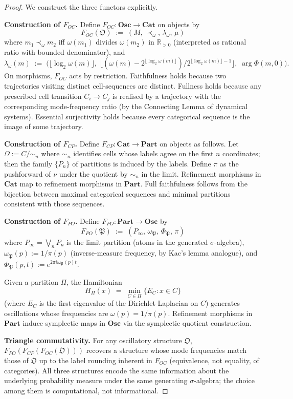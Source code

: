 \begin{proof}
We construct the three functors explicitly.

\smallskip
\noindent\textbf{Construction of $F_{OC}$.}
Define $F_{OC} : \mathbf{Osc} \to \mathbf{Cat}$ on objects by
\[
  F_{OC}(\mathfrak{O}) \;:=\; (M,\, \prec_\omega,\, \lambda_\omega,\, \mu)
\]
where $m_1 \prec_\omega m_2$ iff $\omega(m_1)$ divides $\omega(m_2)$ in
$\mathbb{R}_{>0}$ (interpreted as rational ratio with bounded denominator),
and
\[
  \lambda_\omega(m) \;:=\;
  \bigl(\lfloor \log_2 \omega(m) \rfloor,\;
   \lfloor (\omega(m) - 2^{\lfloor \log_2 \omega(m) \rfloor})
   / 2^{\lfloor \log_2 \omega(m) \rfloor - 1} \rfloor,\;
   \arg \Phi(m, 0) \bigr).
\]
On morphisms, $F_{OC}$ acts by restriction.  Faithfulness holds because
two trajectories visiting distinct cell-sequences are distinct.  Fullness
holds because any prescribed cell transition $C_i \to C_j$ is realised
by a trajectory with the corresponding mode-frequency ratio (by the
Connecting Lemma of dynamical systems).  Essential surjectivity holds
because every categorical sequence is the image of some trajectory.

\smallskip
\noindent\textbf{Construction of $F_{CP}$.}
Define $F_{CP} : \mathbf{Cat} \to \mathbf{Part}$ on objects as follows.
Let $\Omega := C/{\sim_n}$ where $\sim_n$ identifies cells whose labels
agree on the first $n$ coordinates; then the family $\{P_n\}$ of
partitions is induced by the labels.  Define $\pi$ as the pushforward of
$\nu$ under the quotient by $\sim_n$ in the limit.  Refinement morphisms
in $\mathbf{Cat}$ map to refinement morphisms in $\mathbf{Part}$.  Full
faithfulness follows from the bijection between maximal categorical
sequences and minimal partitions consistent with those sequences.

\smallskip
\noindent\textbf{Construction of $F_{PO}$.}
Define $F_{PO} : \mathbf{Part} \to \mathbf{Osc}$ by
\[
  F_{PO}(\mathfrak{P}) \;:=\; (P_\infty,\, \omega_{\mathfrak{P}},\,
  \Phi_{\mathfrak{P}},\, \pi)
\]
where $P_\infty = \bigvee_n P_n$ is the limit partition (atoms in the
generated $\sigma$-algebra), $\omega_{\mathfrak{P}}(p) := 1/\pi(p)$
(inverse-measure frequency, by Kac's lemma analogue), and
$\Phi_{\mathfrak{P}}(p, t) := e^{2\pi i \omega_{\mathfrak{P}}(p) t}$.

Given a partition $\Pi$, the Hamiltonian
\[
  H_\Pi(x) \;=\; \min_{C \in \Pi} \{ E_C : x \in C \}
\]
(where $E_C$ is the first eigenvalue of the Dirichlet Laplacian on $C$)
generates oscillations whose frequencies are $\omega(p) = 1/\pi(p)$.
Refinement morphisms in $\mathbf{Part}$ induce symplectic maps in
$\mathbf{Osc}$ via the symplectic quotient construction.

\smallskip
\noindent\textbf{Triangle commutativity.}
For any oscillatory structure $\mathfrak{O}$,
$F_{PO}(F_{CP}(F_{OC}(\mathfrak{O})))$ recovers a structure whose mode
frequencies match those of $\mathfrak{O}$ up to the label rounding
inherent in $F_{OC}$ (equivalence, not equality, of categories).  All
three structures encode the same information about the underlying
probability measure under the same generating $\sigma$-algebra; the
choice among them is computational, not informational.
\end{proof}

